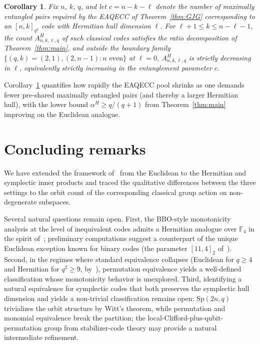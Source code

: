 \documentclass[11pt]{article}
\theoremstyle{plain}
\newtheorem{corollary}[theorem]{Corollary}
\theoremstyle{remark}
\newcommand{\F}{\mathbb{F}}
\begin{document}
\begin{corollary}\label{cor:eaqecc-monotone}
Fix $n$, $k$, $q$, and let $c = n - k - \ell$ denote the number of
maximally entangled pairs required by the EAQECC of Theorem~\ref{thm:GJG}
corresponding to an $[n,k]_{q^2}$ code with Hermitian hull dimension
$\ell$. For $\ell + 1 \leq k \leq n - \ell - 1$, the count
$A^H_{n,k,\ell,q}$ of such classical codes satisfies the ratio
decomposition of Theorem~\ref{thm:main}, and outside the boundary family
$\{(q, k) = (2, 1), (2, n-1) : n \text{ even}\}$ at $\ell = 0$,
$A^H_{n,k,\ell,q}$ is strictly decreasing in $\ell$, equivalently strictly
\emph{increasing} in the entanglement parameter $c$.
\end{corollary}

Corollary~\ref{cor:eaqecc-monotone} quantifies how rapidly the EAQECC pool
shrinks as one demands fewer pre-shared maximally entangled pairs (and
thereby a larger Hermitian hull), with the lower bound
$\alpha^H \geq q/(q+1)$ from Theorem~\ref{thm:main} improving on the
Euclidean analogue.

\section{Concluding remarks}\label{sec:concl}

We have extended the framework of~\cite{BBOz2026} from the Euclidean to the
Hermitian and symplectic inner products and traced the qualitative differences
between the three settings to the orbit count of the corresponding classical
group action on non-degenerate subspaces.

Several natural questions remain open. First, the BBO-style monotonicity
analysis at the level of inequivalent codes admits a Hermitian analogue
over $\F_4$ in the spirit of~\cite[Section IV]{BBOz2026}; preliminary
computations suggest a counterpart of the unique Euclidean exception
known for binary codes (the parameter $[11, 4]_2$ of~\cite{BBOz2026}).
Second, in the regimes where standard equivalence collapses (Euclidean for
$q \geq 4$ and Hermitian for $q^2 \geq 9$, by~\cite{CarletMesnagerTang2018}),
permutation equivalence yields a well-defined classification whose
monotonicity behavior is unexplored. Third, identifying a natural
equivalence for symplectic codes that both preserves the symplectic hull
dimension and yields a non-trivial classification remains open:
$\mathrm{Sp}(2n, q)$ trivializes the orbit structure by Witt's theorem,
while permutation and monomial equivalence break the partition; the
local-Clifford-plus-qubit-permutation group from stabilizer-code theory
may provide a natural intermediate refinement.
\end{document}
